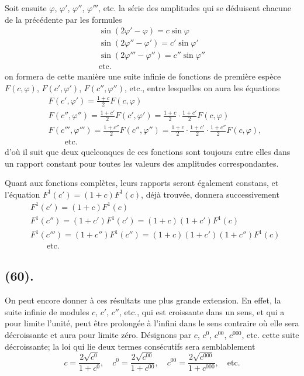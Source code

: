 \documentclass{article}
\begin{document}
Soit ensuite $\varphi$, $\varphi'$, $\varphi''$, $\varphi'''$, etc. la série des amplitudes qui se déduisent chacune de la précédente par les formules
\[ \begin{gathered} \sin(2\varphi'-\varphi)=c\sin\varphi\\ \sin(2\varphi''-\varphi')=c'\sin\varphi'\\ \sin(2\varphi'''-\varphi'')=c''\sin\varphi''\\ \text{etc.} \end{gathered} \]
on formera de cette manière une suite infinie de fonctions de première espèce $F(c,\varphi)$, $F(c',\varphi')$, $F(c'',\varphi'')$, etc., entre lesquelles on aura les équations
\[ \begin{aligned} &F(c',\varphi')=\frac{1+c}{2}F(c,\varphi)\\ &F(c'',\varphi'')=\frac{1+c'}{2}F(c',\varphi')=\frac{1+c}{2}\cdot\frac{1+c'}{2}F(c,\varphi)\\ &F(c''',\varphi''')=\frac{1+c''}{2}F(c'',\varphi'')=\frac{1+c}{2}\cdot\frac{1+c'}{2}\cdot\frac{1+c''}{2}F(c,\varphi),\\ &\qquad\text{etc.} \end{aligned} \]
d'où il suit que deux quelconques de ces fonctions sont toujours entre elles dans un rapport constant pour toutes les valeurs des amplitudes correspondantes.

Quant aux fonctions complètes, leurs rapports seront également constans, et l'équation $F^{1}(c')=(1+c)F^{1}(c)$, déjà trouvée, donnera successivement
\[ \begin{aligned} &F^{1}(c')=(1+c)F^{1}(c)\\ &F^{1}(c'')=(1+c')F^{1}(c')=(1+c)(1+c')F^{1}(c)\\ &F^{1}(c''')=(1+c'')F^{1}(c'')=(1+c)(1+c')(1+c'')F^{1}(c)\\ &\qquad\text{etc.} \end{aligned} \]

\subsection*{(60).}

On peut encore donner à ces résultats une plus grande extension. En effet, la suite infinie de modules $c$, $c'$, $c''$, etc., qui est croissante dans un sens, et qui a pour limite l'unité, peut être prolongée à l'infini dans le sens contraire où elle sera décroissante et aura pour limite zéro. Désignons par $c$, $c^{0}$, $c^{00}$, $c^{000}$, etc. cette suite décroissante; la loi qui lie deux termes consécutifs sera semblablement
\[ c=\frac{2\sqrt{c^{0}}}{1+c^{0}},\quad c^{0}=\frac{2\sqrt{c^{00}}}{1+c^{00}},\quad c^{00}=\frac{2\sqrt{c^{000}}}{1+c^{000}},\quad\text{etc.} \]
\end{document}
